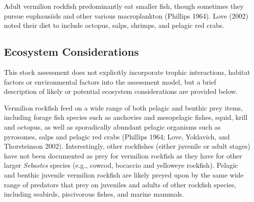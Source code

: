 \documentclass[11pt,
  english,
  a4paper,
]{article}
\begin{document}
Adult vermilion rockfish predominantly eat smaller fish, though sometimes they pursue euphausiids and other various macroplankton {(Phillips 1964)\leavevmode\tagmcend\tagstructend}. Love {(2002)\leavevmode\tagmcend\tagstructend} noted their diet to include octopus, salps, shrimps, and pelagic red crabs.

\leavevmode\tagmcend\tagstructend\par


\hypertarget{ecosystem-considerations-1}{%
\subsection{Ecosystem Considerations}\label{ecosystem-considerations-1}}

\leavevmode\tagmcend\tagstructend


This stock assessment does not explicitly incorporate trophic interactions, habitat factors or environmental factors into the assessment model, but a brief description of likely or potential ecosystem considerations are provided below.

\leavevmode\tagmcend\tagstructend\par


Vermilion rockfish feed on a wide range of both pelagic and benthic prey items, including forage fish species such as anchovies and mesopelagic fishes, squid, krill and octopus, as well as sporadically abundant pelagic organisms such as pyrosomes, salps and pelagic red crabs {(Phillips 1964; Love, Yoklavich, and Thorsteinson 2002)\leavevmode\tagmcend\tagstructend}. Interestingly, other rockfishes (either juvenile or adult stages) have not been documented as prey for vermilion rockfish as they have for other larger \emph{Sebastes} species (e.g., cowcod, bocaccio and yelloweye rockfish). Pelagic and benthic juvenile vermilion rockfish are likely preyed upon by the same wide range of predators that prey on juveniles and adults of other rockfish species, including seabirds, piscivorous fishes, and marine mammals.

\leavevmode\tagmcend\tagstructend\par
\end{document}
